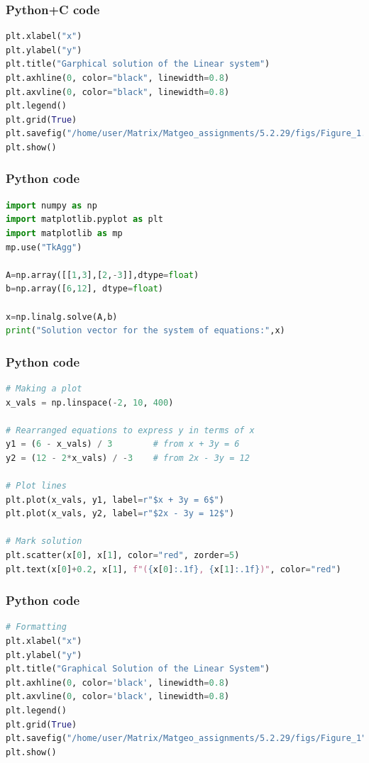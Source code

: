 \documentclass{beamer}
\begin{document}
\begin{frame}[fragile]
    \frametitle{Python+C code}

    \begin{lstlisting}[language=Python]
plt.xlabel("x")
plt.ylabel("y")
plt.title("Garphical solution of the Linear system")
plt.axhline(0, color="black", linewidth=0.8)
plt.axvline(0, color="black", linewidth=0.8)
plt.legend()
plt.grid(True)
plt.savefig("/home/user/Matrix/Matgeo_assignments/5.2.29/figs/Figure_1.png")
plt.show()
    \end{lstlisting}
\end{frame}

\begin{frame}[fragile]
    \frametitle{Python code}
    \begin{lstlisting}[language=Python]
import numpy as np
import matplotlib.pyplot as plt
import matplotlib as mp
mp.use("TkAgg")

A=np.array([[1,3],[2,-3]],dtype=float)
b=np.array([6,12], dtype=float)

x=np.linalg.solve(A,b)
print("Solution vector for the system of equations:",x)
    \end{lstlisting}   
\end{frame}

\begin{frame}[fragile]
    \frametitle{Python code}
    \begin{lstlisting}[language=Python]
# Making a plot
x_vals = np.linspace(-2, 10, 400)

# Rearranged equations to express y in terms of x
y1 = (6 - x_vals) / 3        # from x + 3y = 6
y2 = (12 - 2*x_vals) / -3    # from 2x - 3y = 12

# Plot lines
plt.plot(x_vals, y1, label=r"$x + 3y = 6$")
plt.plot(x_vals, y2, label=r"$2x - 3y = 12$")

# Mark solution
plt.scatter(x[0], x[1], color="red", zorder=5)
plt.text(x[0]+0.2, x[1], f"({x[0]:.1f}, {x[1]:.1f})", color="red")
    \end{lstlisting}
    
\end{frame}

\begin{frame}[fragile]
    \frametitle{Python code}
    \begin{lstlisting}[language=Python]
# Formatting
plt.xlabel("x")
plt.ylabel("y")
plt.title("Graphical Solution of the Linear System")
plt.axhline(0, color='black', linewidth=0.8)
plt.axvline(0, color='black', linewidth=0.8)
plt.legend()
plt.grid(True)
plt.savefig("/home/user/Matrix/Matgeo_assignments/5.2.29/figs/Figure_1")
plt.show()
    \end{lstlisting}  
\end{frame}
\end{document}
